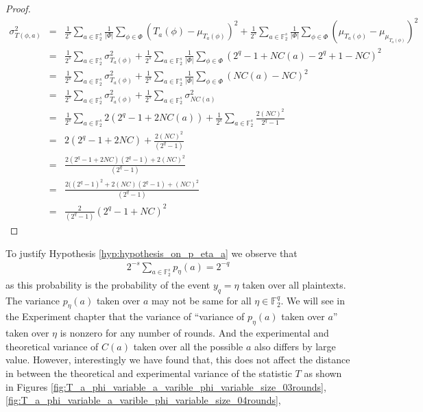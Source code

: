\begin{proof}
\begin{eqnarray*}
\sigma^2_{T\left(\phi,a\right)} &=& \frac{1}{2^{s}}\displaystyle\sum_{a \in \mathbb{F}_{2}^{s}}\frac{1}{|\Phi|}\displaystyle\sum_{\phi \in \Phi}(T_{a}(\phi) - \mu_{T_{a}(\phi)})^2  + \frac{1}{2^{s}}\displaystyle\sum_{a \in \mathbb{F}_{2}^{s}}\frac{1}{|\Phi|}\displaystyle\sum_{\phi \in \Phi}(\mu_{T_{a}(\phi)} - \mu_{\mu_{T_{a}(\phi)}})^2\\
&=& \frac{1}{2^{s}}\displaystyle\sum_{a \in \mathbb{F}_{2}^{s}} \sigma^2_{T_{a}(\phi)} + \frac{1}{2^{s}}\displaystyle\sum_{a \in \mathbb{F}_{2}^{s}}\frac{1}{|\Phi|}\displaystyle\sum_{\phi \in \Phi}(2^q -1 + NC(a) - 2^q + 1 - NC)^2\\
&=& \frac{1}{2^{s}}\displaystyle\sum_{a \in \mathbb{F}_{2}^{s}} \sigma^2_{T_{a}(\phi)} + \frac{1}{2^{s}}\displaystyle\sum_{a \in \mathbb{F}_{2}^{s}}\frac{1}{|\Phi|}\displaystyle\sum_{\phi \in \Phi}(NC(a) - NC)^2\\
&=& \frac{1}{2^{s}}\displaystyle\sum_{a \in \mathbb{F}_{2}^{s}} \sigma^2_{T_{a}(\phi)} + \frac{1}{2^{s}}\displaystyle\sum_{a \in \mathbb{F}_{2}^{s}}\sigma^{2}_{NC(a)}\\
&=& \frac{1}{2^{s}}\displaystyle\sum_{a \in \mathbb{F}_{2}^{s}} 2(2^q-1+2NC(a)) + \frac{1}{2^{s}}\displaystyle\sum_{a \in \mathbb{F}_{2}^{s}}\frac{2(NC)^2}{2^q-1}\\
&=& 2(2^q-1+2NC) + \frac{2(NC)^2}{(2^q-1)}\\
&=& \frac{2(2^q-1+2NC)(2^q - 1) + 2(NC)^2}{(2^q-1)}\\
&=& \frac{2((2^q - 1)^2 + 2(NC)(2^q -1) + (NC)^2}{(2^q-1)} \\
&=& \frac{2}{(2^q -1)}(2^q -1 + NC)^2
\end{eqnarray*}
\end{proof}
\par \noindent To justify Hypothesis \ref{hyp:hypothesis_on_p_eta_a} we observe that 
\begin{eqnarray*}
2^{-s}\displaystyle\sum_{a \in \mathbb{F}_{2}^{s}}p_{\eta}(a) = 2^{-q}
\end{eqnarray*} as this probability is the probability of the event $y_q = \eta$ taken over all plaintexts. The variance $p_{\eta}\left(a\right)$ taken over $a$ may not be same for all $\eta \in \mathbb{F}_2^q$. We will see in the Experiment chapter that the variance of ``variance of $p_{\eta}\left( a \right)$ taken over $a$'' taken over $\eta$ is nonzero for any number of rounds. And the experimental and theoretical variance of $C\left(a\right)$ taken over all the possible $a$ also differs by large value. However, interestingly we have found that, this does not affect the distance in between the theoretical and experimental variance of the statistic $T$ as shown in Figures \ref{fig:T_a_phi_variable_a_varible_phi_variable_size_03rounds}, \ref{fig:T_a_phi_variable_a_varible_phi_variable_size_04rounds},

